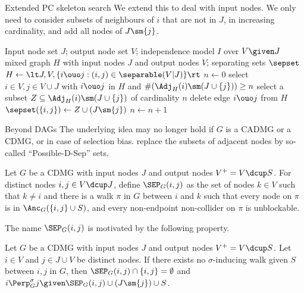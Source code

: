 \begin{frame}{Extended PC skeleton search}
We extend this to deal with input nodes.
We only need to consider subsets of neighbours of $i$ that are not in $J$, in increasing cardinality, and add all nodes of $J \sm \{j\}$.

\medskip
\footnotesize
  \begin{algorithmic}[1]
  \Input Input node set $J$; output node set $V$; independence model $I$ over $V \given J$
  \Output mixed graph $H$ with input nodes $J$ and output nodes $V$; separating sets $\sepset$
    \State $H \leftarrow \lt J, V, \{i \ouo j : (i,j) \in \separable(V|J)\} \rt$
  \State $n \leftarrow 0$
    \Repeat
    \Repeat
    \State select $i\in V, j \in V \cup J$ with $i \ouo j$ in $H$ and $\#(\Adj_H(i)\sm(J\cup\{j\})) \ge n$
    \State select a subset $Z \subseteq \Adj_H(i)\sm(J\cup\{j\})$ of cardinality $n$
      \State delete edge $i \ouo j$ from $H$
      \State $\sepset(\{i,j\}) \leftarrow Z \cup (J \sm \{j\})$
    \EndIf
    \State $n \leftarrow n + 1$
  \end{algorithmic}
\end{frame}

\begin{frame}{Beyond DAGs}
The underlying idea may no longer hold if $G$ is a CADMG or a CDMG, or in case of selection bias.
\cite{SMR1995} replace the subsets of adjacent nodes by so-called ``Possible-D-Sep'' sets.

\begin{Def}[\ref{def:SEP}]
  Let $G$ be a CDMG with input nodes $J$ and output nodes $V^+ = V \dcup S$.
  For distinct nodes $i,j \in V \dcup J$,
  define $\SEP_G(i,j)$ as the set of nodes $k \in V$ such that
  $k \ne i$ and there is a walk $\pi$ in $G$ between $i$ and $k$ such that every node
  on $\pi$ is in $\Anc_G(\{i,j\}\cup S)$, and every non-endpoint non-collider on $\pi$ is unblockable.
\end{Def}
The name $\SEP_G(i,j)$ is motivated by the following property.
\begin{Prp}[\ref{prp:SEP}]
  Let $G$ be a CDMG with input nodes $J$ and output nodes $V^+ = V \dcup S$.
  Let $i \in V$ and $j \in J \cup V$ be distinct nodes.
  If there exists no $\sigma$-inducing walk given $S$ between $i,j$ in $G$, then $\SEP_G(i,j) \cap \{i,j\} = \emptyset$ and $i \Perp^\sigma_G j \given \SEP_G(i,j) \cup (J \sm \{j\}) \cup S$.
\end{Prp}
\end{frame}

